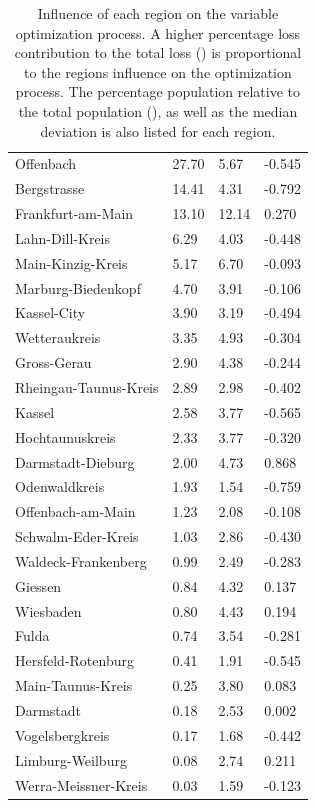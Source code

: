 \begin{table}[h]
	\caption[Analysis of loss contribution per region in Hesse]{Influence of each region on the variable optimization process. A higher percentage loss contribution
		to the total loss () is proportional to the regions influence on the optimization process.
		The percentage population relative to the total population (), as
		well as the median deviation is also listed for each region.}
	\centering
	\begin{tabular}{|l|x{2cm}|x{2cm}|x{2cm}|}
		\hline
		 &  &  &  \\ \hline \hline
		Offenbach & 27.70 & 5.67 & -0.545 \\ \hline
		Bergstrasse & 14.41 & 4.31 & -0.792 \\ \hline
		Frankfurt-am-Main & 13.10 & 12.14 & 0.270 \\ \hline
		Lahn-Dill-Kreis & 6.29 & 4.03 & -0.448 \\ \hline
		Main-Kinzig-Kreis & 5.17 & 6.70 & -0.093 \\ \hline
		Marburg-Biedenkopf & 4.70 & 3.91 & -0.106 \\ \hline
		Kassel-City & 3.90 & 3.19 & -0.494 \\ \hline
		Wetteraukreis & 3.35 & 4.93 & -0.304 \\ \hline
		Gross-Gerau & 2.90 & 4.38 & -0.244 \\ \hline
		Rheingau-Taunus-Kreis & 2.89 & 2.98 & -0.402 \\ \hline
		Kassel & 2.58 & 3.77 & -0.565 \\ \hline
		Hochtaunuskreis & 2.33 & 3.77 & -0.320 \\ \hline
		Darmstadt-Dieburg & 2.00 & 4.73 & 0.868 \\ \hline
		Odenwaldkreis & 1.93 & 1.54 & -0.759 \\ \hline
		Offenbach-am-Main & 1.23 & 2.08 & -0.108 \\ \hline
		Schwalm-Eder-Kreis & 1.03 & 2.86 & -0.430 \\ \hline
		Waldeck-Frankenberg & 0.99 & 2.49 & -0.283 \\ \hline
		Giessen & 0.84 & 4.32 & 0.137 \\ \hline
		Wiesbaden & 0.80 & 4.43 & 0.194 \\ \hline
		Fulda & 0.74 & 3.54 & -0.281 \\ \hline
		Hersfeld-Rotenburg & 0.41 & 1.91 & -0.545 \\ \hline
		Main-Taunus-Kreis & 0.25 & 3.80 & 0.083 \\ \hline
		Darmstadt & 0.18 & 2.53 & 0.002 \\ \hline
		Vogelsbergkreis & 0.17 & 1.68 & -0.442 \\ \hline
		Limburg-Weilburg & 0.08 & 2.74 & 0.211 \\ \hline
		Werra-Meissner-Kreis & 0.03 & 1.59 & -0.123 \\ \hline
	\end{tabular}
	\label{tab:perc_region_loss}
\end{table}

